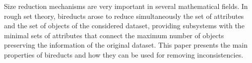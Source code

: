 
Size reduction mechanisms are very important  in several mathematical fields. In rough set theory, bireducts arose to reduce  simultaneously  the set of attributes and the set of objects of the considered dataset, providing subsystems with the minimal sets of attributes that connect the maximum number of objects preserving the information of the original dataset. This paper   presents the main properties of bireducts and how they can be used  for removing inconsistencies. 

